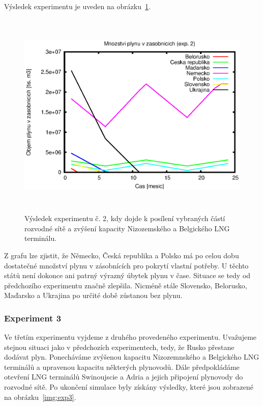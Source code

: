 \documentclass[a4paper,12pt]{article}
\begin{document}
  Výsledek experimentu je uveden na obrázku~\ref{img:exp2}. 
  \begin{figure}[!ht]
    \centering
    \includegraphics[height=10cm]{img/1O.eps}
    \caption{Výsledek experimentu č. 2, kdy dojde k posílení vybraných částí 
    rozvodné sítě a zvýšení kapacity Nizozemského a Belgického LNG terminálu.}
    \label{img:exp2}
  \end{figure}
  
  Z grafu lze zjistit, že Německo, Česká republika a Polsko má po celou dobu dostatečné množství plynu v 
  zásobnících pro pokrytí vlastní potřeby. U těchto států není dokonce ani patrný výrazný úbytek plynu v čase. Situace 
  se tedy od předchozího experimentu značně zlepšila. Nicméně stále Slovensko, Belorusko, 
  Maďarsko a Ukrajina po určité době zůstanou bez plynu.
  
  \subsubsection{Experiment 3}
  Ve třetím experimentu vyjdeme z druhého provedeného experimentu. Uvažujeme stejnou situaci 
  jako v předchozích experimentech, tedy, že Rusko přestane dodávat plyn. Ponecháváme 
  zvýšenou kapacitu Nizozemnského a Belgického LNG terminálů a upravenou kapacitu některých plynovodů. Dále 
  předpokládáme otevření LNG terminálů Swinoujscie a Adria a jejich připojení plynovody do 
  rozvodné sítě. Po ukončení simulace byly získány výsledky, které jsou zobrazené na obrázku~\ref{img:exp3}. 
   
\end{document}
